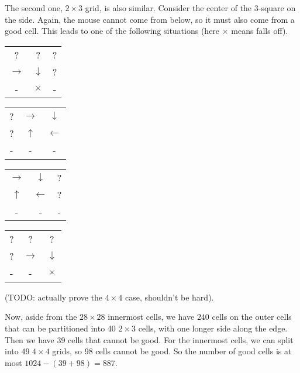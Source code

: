 \documentclass[11pt,a4paper]{article}
\begin{document}
\begin{enumerate}
    The second one, $2\times 3$ grid, is also similar. Consider the center of the 3-square on the side. 
    Again, the mouse cannot come from below, so it must also come from a good cell. 
    This leads to one of the following situations (here $\times$ means falls off). 
    \begin{table}[H]
    	\begin{center}
    		\begin{tabular}{ccc}
    			? & ? & ?\\
    			$\rightarrow$ & $\downarrow$ & ?\\
    			- & $\times$ & -\\
    		\end{tabular}
    	\end{center}
    \end{table}
\begin{table}[H]
	\begin{center}
		\begin{tabular}{ccc}
			? & $\rightarrow$ & $\downarrow$\\
			? & $\uparrow$ & $\leftarrow$\\
			- & - & -\\
		\end{tabular}
	\end{center}
\end{table}
\begin{table}[H]
	\begin{center}
		\begin{tabular}{ccc}
			$\rightarrow$ & $\downarrow$ & ?\\
			$\uparrow$ & $\leftarrow$ & ?\\
			- & - & -\\
		\end{tabular}
	\end{center}
\end{table}

\begin{table}[H]
	\begin{center}
		\begin{tabular}{ccc}
			? & ? & ?\\
			? & $\rightarrow$ & $\downarrow$\\
			- & - & $\times$\\
		\end{tabular}
	\end{center}
\end{table}
(TODO: actually prove the $4\times 4$ case, shouldn't be hard). 

Now, aside from the $28\times 28$ innermost cells, 
we have $240$ cells on the outer cells that can be partitioned into 40 $2\times 3$ cells, 
with one longer side along the edge. 
Then we have 39 cells that cannot be good. 
For the innermost cells, we can split into 49 $4\times 4$ grids, so 98 cells cannot be good. 
So the number of good cells is at most $1024-(39+98)=887$. 


\end{enumerate}
\end{document}
